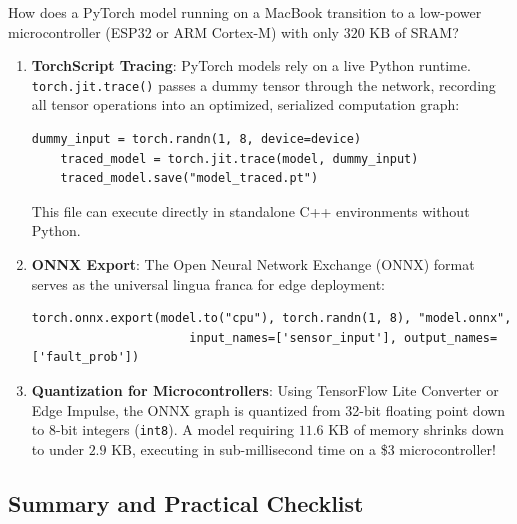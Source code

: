 \begin{iotbox}
How does a PyTorch model running on a MacBook transition to a low-power microcontroller (ESP32 or ARM Cortex-M) with only $320\text{ KB}$ of SRAM?
\begin{enumerate}
    \item \textbf{TorchScript Tracing}: PyTorch models rely on a live Python runtime. \texttt{torch.jit.trace()} passes a dummy tensor through the network, recording all tensor operations into an optimized, serialized computation graph:
    \begin{lstlisting}[style=pythonstyle]
    dummy_input = torch.randn(1, 8, device=device)
    traced_model = torch.jit.trace(model, dummy_input)
    traced_model.save("model_traced.pt")
    \end{lstlisting}
    This file can execute directly in standalone C++ environments without Python.
    \item \textbf{ONNX Export}: The Open Neural Network Exchange (ONNX) format serves as the universal lingua franca for edge deployment:
    \begin{lstlisting}[style=pythonstyle]
    torch.onnx.export(model.to("cpu"), torch.randn(1, 8), "model.onnx",
                      input_names=['sensor_input'], output_names=['fault_prob'])
    \end{lstlisting}
    \item \textbf{Quantization for Microcontrollers}: Using TensorFlow Lite Converter or Edge Impulse, the ONNX graph is quantized from 32-bit floating point down to 8-bit integers (\texttt{int8}). A model requiring $11.6\text{ KB}$ of memory shrinks down to under $2.9\text{ KB}$, executing in sub-millisecond time on a \$3 microcontroller!
\end{enumerate}
\end{iotbox}

\subsection{Summary and Practical Checklist}\label{subsec:pytorch_summary}

